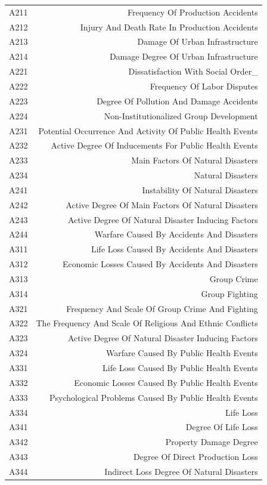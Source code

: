 \documentclass[12pt]{article}  %
\begin{document}
\begin{table}[!ht]
\begin{tabular}{cr}
        A211 & Frequency Of Production Accidents  \\ 
        A212 & Injury And Death Rate In Production Accidents  \\ 
        A213 & Damage Of Urban Infrastructure \\ 
        A214 & Damage Degree Of Urban Infrastructure  \\ 
        A221 & Dissatisfaction With Social Order\_  \\ 
        A222 & Frequency Of Labor Disputes  \\ 
        A223 & Degree Of Pollution And Damage Accidents  \\ 
        A224 & Non-Institutionalized Group Development  \\ 
        A231 & Potential Occurrence And Activity Of Public Health Events  \\ 
        A232 & Active Degree Of Inducements For Public Health Events  \\ 
        A233 & Main Factors Of Natural Disasters \\ 
        A234 & Natural Disasters \\ 
        A241 & Instability Of Natural Disasters  \\ 
        A242 & Active Degree Of Main Factors Of Natural Disasters  \\ 
        A243 & Active Degree Of Natural Disaster Inducing Factors  \\ 
        A244 & Warfare Caused By Accidents And Disasters  \\ 
        A311 & Life Loss Caused By Accidents And Disasters  \\ 
        A312 & Economic Losses Caused By Accidents And Disasters  \\ 
        A313 & Group Crime  \\ 
        A314 & Group Fighting  \\ 
        A321 & Frequency And Scale Of Group Crime And Fighting  \\ 
        A322 & The Frequency And Scale Of Religious And Ethnic Conflicts  \\ 
        A323 & Active Degree Of Natural Disaster Inducing Factors  \\ 
        A324 & Warfare Caused By Public Health Events  \\ 
        A331 & Life Loss Caused By Public Health Events \\ 
        A332 & Economic Losses Caused By Public Health Events  \\ 
        A333 & Psychological Problems Caused By Public Health Events  \\ 
        A334 & Life Loss  \\ 
        A341 & Degree Of Life Loss  \\ 
        A342 & Property Damage Degree  \\ 
        A343 & Degree Of Direct Production Loss  \\ 
        A344 & Indirect Loss Degree Of Natural Disasters  \\ \hline
    \end{tabular}
\end{table}
\end{document}
